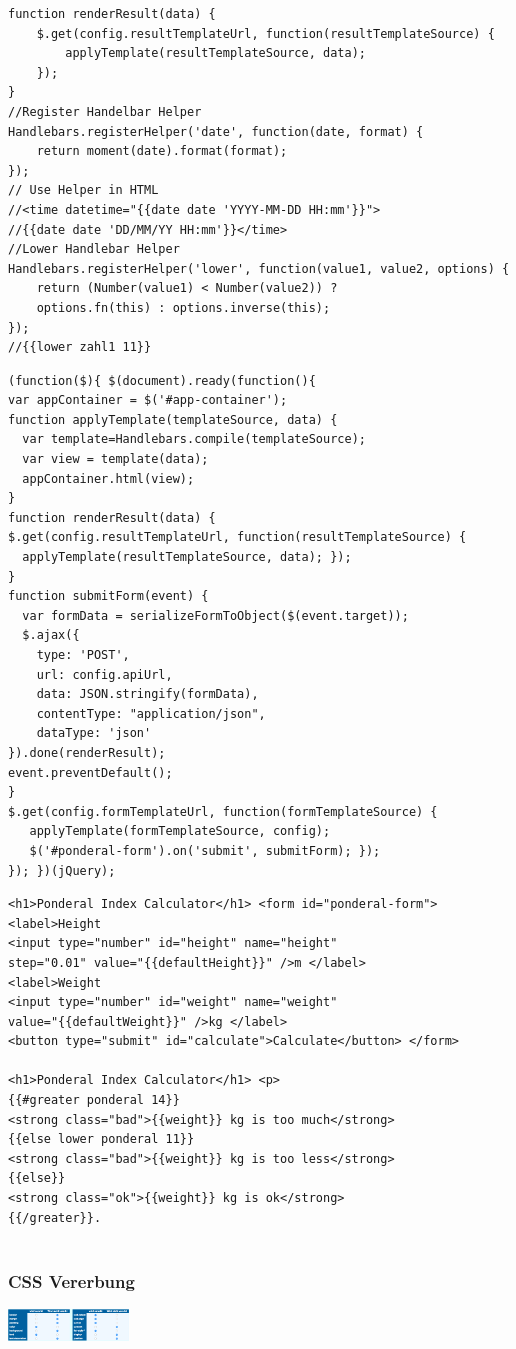 \begin{multicols*}{4}
\begin{verbatim}
function renderResult(data) {
	$.get(config.resultTemplateUrl, function(resultTemplateSource) {
		applyTemplate(resultTemplateSource, data);
	});
}
//Register Handelbar Helper
Handlebars.registerHelper('date', function(date, format) {
	return moment(date).format(format);
});
// Use Helper in HTML
//<time datetime="{{date date 'YYYY-MM-DD HH:mm'}}">
//{{date date 'DD/MM/YY HH:mm'}}</time>
//Lower Handlebar Helper
Handlebars.registerHelper('lower', function(value1, value2, options) {
	return (Number(value1) < Number(value2)) ? 
	options.fn(this) : options.inverse(this);
});
//{{lower zahl1 11}}
\end{verbatim}
\begin{verbatim}
(function($){ $(document).ready(function(){
var appContainer = $('#app-container'); 
function applyTemplate(templateSource, data) {
  var template=Handlebars.compile(templateSource);
  var view = template(data); 
  appContainer.html(view);
}
function renderResult(data) {
$.get(config.resultTemplateUrl, function(resultTemplateSource) {
  applyTemplate(resultTemplateSource, data); });
}
function submitForm(event) {
  var formData = serializeFormToObject($(event.target)); 
  $.ajax({
    type: 'POST',
    url: config.apiUrl,
    data: JSON.stringify(formData), 
    contentType: "application/json", 
    dataType: 'json'
}).done(renderResult); 
event.preventDefault();
}
$.get(config.formTemplateUrl, function(formTemplateSource) {
   applyTemplate(formTemplateSource, config);
   $('#ponderal-form').on('submit', submitForm); });
}); })(jQuery);
\end{verbatim}
\begin{verbatim}
<h1>Ponderal Index Calculator</h1> <form id="ponderal-form">
<label>Height
<input type="number" id="height" name="height"
step="0.01" value="{{defaultHeight}}" />m </label>
<label>Weight
<input type="number" id="weight" name="weight"
value="{{defaultWeight}}" />kg </label>
<button type="submit" id="calculate">Calculate</button> </form>

<h1>Ponderal Index Calculator</h1> <p>
{{#greater ponderal 14}}
<strong class="bad">{{weight}} kg is too much</strong>
{{else lower ponderal 11}}
<strong class="bad">{{weight}} kg is too less</strong> 
{{else}}
<strong class="ok">{{weight}} kg is ok</strong> 
{{/greater}}.


\end{verbatim}
\subsubsection{CSS Vererbung}
\includegraphics[width=0.24\textwidth]{images/some}





\end{multicols*}
